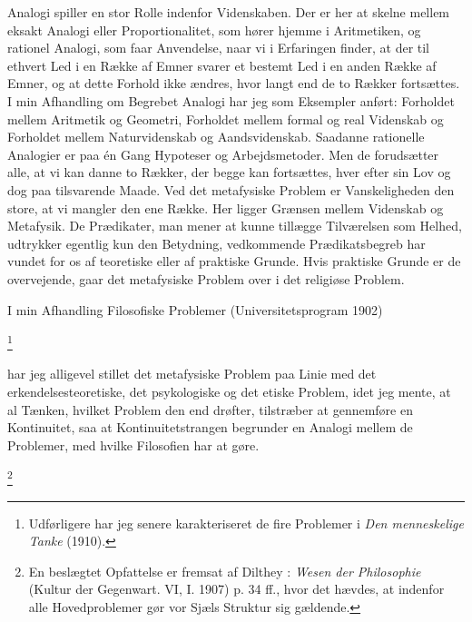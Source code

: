 \documentclass[12pt]{article}
\newcommand{\apage}[1]{\marginnote{\footnotesize\textit{[#1]}}}
\begin{document}
Analogi spiller en stor Rolle indenfor Videnskaben. Der er her at skelne mellem
eksakt Analogi eller Proportionalitet, som hører hjemme i Aritmetiken, og
rationel Analogi, som faar Anvendelse, naar vi i Erfaringen finder, at der til
ethvert Led i en Række af Emner svarer et bestemt Led i en anden Række af
Emner, og at dette Forhold ikke ændres, hvor langt end de to Rækker fortsættes.
I min Afhandling om Begrebet Analogi har jeg som Eksempler anført: Forholdet
mellem Aritmetik og Geometri, Forholdet mellem formal og real Videnskab og
\setcounter{footnote}{0}%
\apage{84}Forholdet mellem Naturvidenskab og Aandsvidenskab. Saadanne
rationelle Analogier er paa én Gang Hypoteser og Arbejdsmetoder. Men de
forudsætter alle, at vi kan danne to Rækker, der begge kan fortsættes, hver
efter sin Lov og dog paa tilsvarende Maade. Ved det metafysiske Problem er
Vanskeligheden den store, at vi mangler den ene Række. Her ligger Grænsen
mellem Videnskab og Metafysik. De Prædikater, man mener at kunne tillægge
Tilværelsen som Helhed, udtrykker egentlig kun den Betydning, vedkommende
Prædikatsbegreb har vundet for os af teoretiske eller af praktiske Grunde. Hvis
praktiske Grunde er de overvejende, gaar det metafysiske Problem over i det
religiøse Problem.

I min Afhandling \guillemotright{}Filosofiske Problemer\guillemotleft{}
(Universitetsprogram 1902)

         \footnote{Udførligere har jeg senere karakteriseret de fire Problemer
i \textit{Den menneskelige Tanke} (1910).}

       har jeg alligevel stillet det metafysiske Problem paa Linie med det
erkendelsesteoretiske, det psykologiske og det etiske Problem, idet jeg mente,
at al Tænken, hvilket Problem den end drøfter, tilstræber at gennemføre en
Kontinuitet, saa at Kontinuitetstrangen begrunder en Analogi mellem de
Problemer, med hvilke Filosofien har at gøre.

         \footnote{En beslægtet Opfattelse er fremsat af Dilthey :
\textit{Wesen der Philosophie} (Kultur der Gegenwart. VI, I. 1907) p. 34 ff.,
hvor det hævdes, at indenfor alle Hovedproblemer gør \guillemotright{}vor Sjæls
Struktur\guillemotleft{} sig gældende.}
\end{document}
